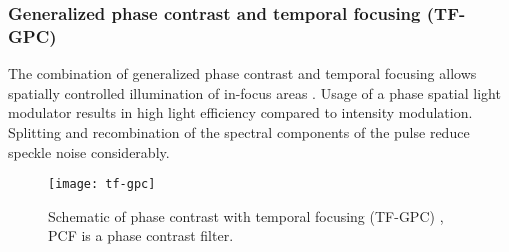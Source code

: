 \subsubsection{Generalized phase contrast and temporal focusing (TF-GPC)}
The combination of generalized phase contrast and temporal focusing
allows spatially controlled illumination of in-focus areas
\citep{Papagiakoumou2010}. Usage of a phase spatial light modulator
results in high light efficiency compared to intensity modulation.
Splitting and recombination of the spectral components of the pulse
reduce speckle noise considerably.
\begin{figure}[!hbt]
  \centering
  \texttt{[image: tf-gpc]} 
  \caption{Schematic of phase contrast with temporal focusing (TF-GPC)
    \citep[from][]{Papagiakoumou2010}, PCF is a phase contrast filter.}
  \label{fig:tf-gpc}
\end{figure}



